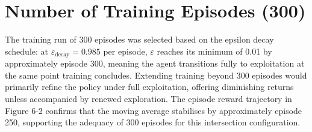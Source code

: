\section{Number of Training Episodes (300)}

The training run of 300 episodes was selected based on the epsilon decay schedule: at \( \varepsilon_{\text{decay}} = 0.985 \) per episode, \( \varepsilon \) reaches its minimum of 0.01 by approximately episode 300, meaning the agent transitions fully to exploitation at the same point training concludes. Extending training beyond 300 episodes would primarily refine the policy under full exploitation, offering diminishing returns unless accompanied by renewed exploration. The episode reward trajectory in Figure 6-2 confirms that the moving average stabilises by approximately episode 250, supporting the adequacy of 300 episodes for this intersection configuration.

